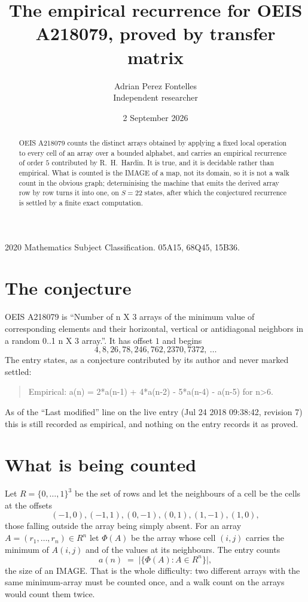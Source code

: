 \documentclass[11pt,a4paper]{article}
\title{The empirical recurrence for OEIS A218079, proved by transfer matrix}
\author{Adrian Perez Fontelles\\ \small Independent researcher}
\date{2 September 2026}
\theoremstyle{plain}
\theoremstyle{definition}
\begin{document}
\maketitle

\begin{abstract}
OEIS A218079 counts the distinct arrays obtained by applying a fixed local operation to every cell
of an array over a bounded alphabet, and carries an empirical recurrence of order $5$
contributed by R.~H.~Hardin. It is true, and it is decidable rather than empirical. What is
counted is the IMAGE of a map, not its domain, so it is not a walk count in the obvious graph;
determinising the machine that emits the derived array row by row turns it into one, on
$S=22$ states, after which the conjectured recurrence is settled by a finite exact
computation.
\end{abstract}

\noindent\small 2020 Mathematics Subject Classification. 05A15, 68Q45, 15B36.\normalsize

\section{The conjecture}

OEIS A218079 is ``Number of n X 3 arrays of the minimum value of corresponding elements and their horizontal, vertical or antidiagonal neighbors in a random 0..1 n X 3 array.''. It has offset $1$ and begins
\[
4, 8, 26, 78, 246, 762, 2370, 7372,\ \dots
\]
The entry states, as a conjecture contributed by its author and never marked settled:
\begin{quote}
Empirical: a(n) = 2*a(n-1) + 4*a(n-2) - 5*a(n-4) - a(n-5) for n>6.
\end{quote}
As of the ``Last modified'' line on the live entry (Jul 24 2018 09:38:42, revision 7) this is still
recorded as empirical, and nothing on the entry records it as proved.

\section{What is being counted}

Let $R=\{0,\dots,1\}^{3}$ be the set of rows and let the neighbours of
a cell be the cells at the offsets
\[
(-1,0), (-1,1), (0,-1), (0,1), (1,-1), (1,0),
\]
those falling outside the array being simply absent. For an array
$A=(r_1,\dots,r_n)\in R^n$ let $\Phi(A)$ be the array whose cell $(i,j)$ carries the
minimum of $A(i,j)$ and of the values at its neighbours. The entry counts
\[
a(n)\;=\;\bigl|\{\Phi(A):A\in R^n\}\bigr| ,
\]
the size of an IMAGE. That is the whole difficulty: two different arrays with the same
minimum-array must be counted once, and a walk count on the arrays would count them twice.
\end{document}
